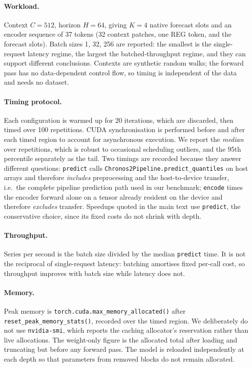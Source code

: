 \paragraph{Workload.}
Context $C=512$, horizon $H=64$, giving $K=4$ native forecast slots and an encoder sequence of 37 tokens (32 context patches, one REG token, and the forecast slots). Batch sizes 1, 32, 256 are reported: the smallest is the single-request
latency regime, the largest the batched-throughput regime, and they can support different
conclusions. Contexts are synthetic random walks; the forward pass has no data-dependent
control flow, so timing is independent of the data and needs no dataset.

\paragraph{Timing protocol.}
Each configuration is warmed up for 20 iterations, which are discarded, then
timed over 100 repetitions. CUDA synchronisation is performed before and after
each timed region to account for asynchronous execution. We report the \emph{median} over
repetitions, which is robust to occasional scheduling outliers, and the 95th percentile
separately as the tail. Two timings are recorded because they answer different questions:
\texttt{predict} calls \texttt{Chronos2Pipeline.predict\_quantiles} on host arrays and
therefore \emph{includes} preprocessing and the host-to-device transfer, i.e.\ the
complete pipeline prediction path used in our benchmark; \texttt{encode} times the
encoder forward alone on a tensor already resident
on the device and therefore \emph{excludes} transfer. Speedups quoted in the main text use
\texttt{predict}, the conservative choice, since its fixed costs do not shrink with depth.

\paragraph{Throughput.}
Series per second is the batch size divided by the median \texttt{predict} time. It is not
the reciprocal of single-request latency: batching amortises fixed per-call cost, so
throughput improves with batch size while latency does not.

\paragraph{Memory.}
Peak memory is \texttt{torch.cuda.max\_memory\_allocated()} after
\texttt{reset\_peak\_memory\_stats()}, recorded over the timed region. We deliberately do
not use \texttt{nvidia-smi}, which reports the caching allocator's reservation rather than
live allocations. The weight-only figure is the allocated total after loading and
truncating but before any forward pass. The model is reloaded independently at each depth
so that parameters from removed blocks do not remain allocated.

